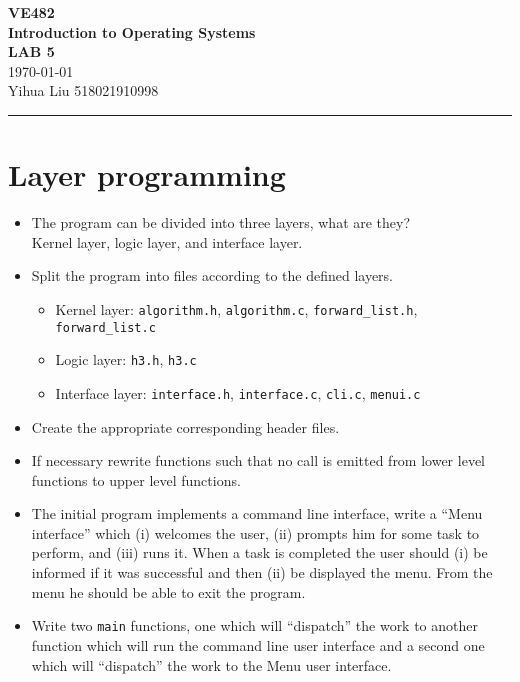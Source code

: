 \documentclass[a4paper]{article}
\begin{document}
\begin{center}
    \huge
    \textbf{VE482\\Introduction to Operating Systems\\}
    \Large
    \vspace{15pt}
    \uppercase{\textbf{Lab 5}}\\
    \large
    \vspace{5pt}\today\\
    \vspace{5pt}
    Yihua Liu 518021910998
    \vspace{5pt}
    \rule[-5pt]{.97\linewidth}{0.05em}
\end{center}
\section{Layer programming}
\begin{itemize}
    \item The program can be divided into three layers, what are they?\\
    Kernel layer, logic layer, and interface layer.
    \item Split the program into files according to the defined layers.\\
    \begin{itemize}
        \item Kernel layer: \texttt{algorithm.h}, \texttt{algorithm.c}, \texttt{forward\_list.h}, \texttt{forward\_list.c}
        \item Logic layer: \texttt{h3.h}, \texttt{h3.c}
        \item Interface layer: \texttt{interface.h}, \texttt{interface.c}, \texttt{cli.c}, \texttt{menui.c}
    \end{itemize}
    \item Create the appropriate corresponding header files.
    \item If necessary rewrite functions such that no call is emitted from lower level functions to upper level functions.
    \item The initial program implements a command line interface, write a “Menu interface” which (i) welcomes the user, (ii) prompts him for some task to perform, and (iii) runs it. When a task is completed the user should (i) be informed if it was successful and then (ii) be displayed the menu. From the menu he should be able to exit the program.
    \item Write two \texttt{main} functions, one which will “dispatch” the work to another function which will run the command line user interface and a second one which will “dispatch” the work to the Menu user interface.
\end{itemize}
\end{document}
